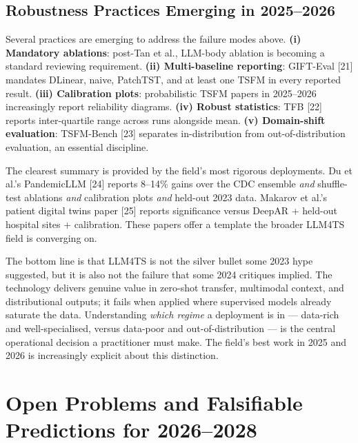 \subsection{Robustness Practices Emerging in 2025--2026}\label{robustness-practices-emerging-in-20252026}

Several practices are emerging to address the failure modes above. \textbf{(i) Mandatory ablations}: post-Tan et al., LLM-body ablation is becoming a standard reviewing requirement. \textbf{(ii) Multi-baseline reporting}: GIFT-Eval {[}21{]} mandates DLinear, naive, PatchTST, and at least one TSFM in every reported result. \textbf{(iii) Calibration plots}: probabilistic TSFM papers in 2025--2026 increasingly report reliability diagrams. \textbf{(iv) Robust statistics}: TFB {[}22{]} reports inter-quartile range across runs alongside mean. \textbf{(v) Domain-shift evaluation}: TSFM-Bench {[}23{]} separates in-distribution from out-of-distribution evaluation, an essential discipline.

The clearest summary is provided by the field's most rigorous deployments. Du et al.'s PandemicLLM {[}24{]} reports 8--14\% gains over the CDC ensemble \emph{and} shuffle-test ablations \emph{and} calibration plots \emph{and} held-out 2023 data. Makarov et al.'s patient digital twins paper {[}25{]} reports significance versus DeepAR + held-out hospital sites + calibration. These papers offer a template the broader LLM4TS field is converging on.

The bottom line is that LLM4TS is not the silver bullet some 2023 hype suggested, but it is also not the failure that some 2024 critiques implied. The technology delivers genuine value in zero-shot transfer, multimodal context, and distributional outputs; it fails when applied where supervised models already saturate the data. Understanding \emph{which regime} a deployment is in --- data-rich and well-specialised, versus data-poor and out-of-distribution --- is the central operational decision a practitioner must make. The field's best work in 2025 and 2026 is increasingly explicit about this distinction.

\section{Open Problems and Falsifiable Predictions for 2026--2028}\label{open-problems-and-falsifiable-predictions-for-20262028}

